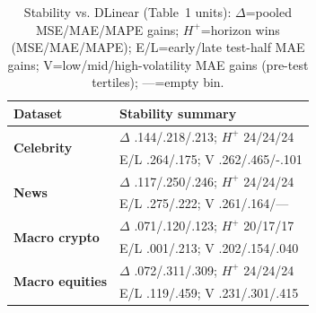 \begin{table}[!t]
\centering
\fontsize{9}{9.8}\selectfont
\setlength{\tabcolsep}{2pt}
\renewcommand{\arraystretch}{1.04}
\caption{Stability vs. DLinear (Table~1 units): $\Delta$=pooled MSE/MAE/MAPE gains; $H^+$=horizon wins (MSE/MAE/MAPE); E/L=early/late test-half MAE gains; V=low/mid/high-volatility MAE gains (pre-test tertiles); ---=empty bin.}
\label{tab:stability}
\begin{tabular}{@{}p{0.88in}p{2.22in}@{}}
\toprule
Dataset & Stability summary\\
\midrule
\multirow{2}{*}{\textbf{Celebrity}} & $\Delta$ .144/.218/.213; $H^+$ 24/24/24\\
& E/L .264/.175; V .262/.465/-.101\\
\midrule
\multirow{2}{*}{\textbf{News}} & $\Delta$ .117/.250/.246; $H^+$ 24/24/24\\
& E/L .275/.222; V .261/.164/---\\
\midrule
\multirow{2}{*}{\textbf{Macro crypto}} & $\Delta$ .071/.120/.123; $H^+$ 20/17/17\\
& E/L .001/.213; V .202/.154/.040\\
\midrule
\multirow{2}{*}{\textbf{Macro equities}} & $\Delta$ .072/.311/.309; $H^+$ 24/24/24\\
& E/L .119/.459; V .231/.301/.415\\
\bottomrule
\end{tabular}
\end{table}
